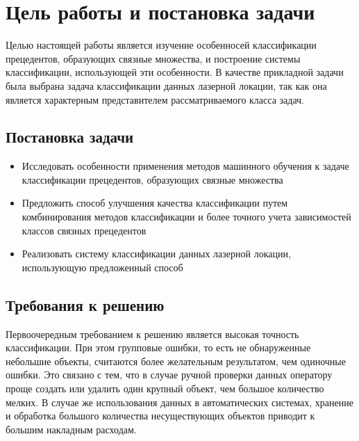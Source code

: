 \newpage
\section{Цель работы и постановка задачи}


Целью настоящей работы является изучение особенносей классификации прецедентов, образующих связные множества, и построение системы классификации, использующей эти особенности. В качестве прикладной задачи была выбрана задача классификации данных лазерной локации, так как она является характерным представителем рассматриваемого класса задач.

\subsection{Постановка задачи}
\begin{itemize}
  \item
  Исследовать особенности применения методов машинного обучения к задаче классификации прецедентов, образующих связные множества
  \item
  Предложить способ улучшения качества классификации путем комбинирования методов классификации и более точного учета зависимостей классов связных прецедентов 
  \item
  Реализовать систему классификации данных лазерной локации, использующую предложенный способ
\end{itemize}

\subsection{Требования к решению}

Первоочередным требованием к решению является высокая точность классификации. При этом групповые ошибки, то есть не обнаруженные небольшие объекты, считаются более желательным результатом, чем одиночные ошибки. Это связано с тем, что в случае ручной проверки данных оператору проще создать или удалить один крупный объект, чем большое количество мелких. В случае же использования данных в автоматических системах, хранение и обработка большого количества несуществующих объектов приводит к большим накладным расходам.